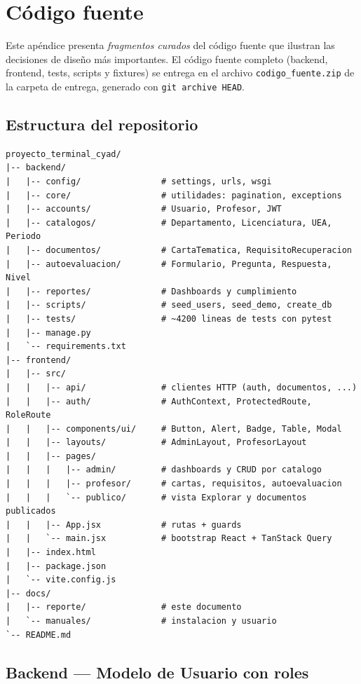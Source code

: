 \section{Código fuente}\label{apx:codigo}
\justifying

Este apéndice presenta \emph{fragmentos curados} del código fuente que ilustran las decisiones de diseño más importantes. El código fuente completo (backend, frontend, tests, scripts y fixtures) se entrega en el archivo \texttt{codigo\_fuente.zip} de la carpeta de entrega, generado con \texttt{git archive HEAD}.

\subsection{Estructura del repositorio}

\begin{Verbatim}[fontsize=\small, frame=single]
proyecto_terminal_cyad/
|-- backend/
|   |-- config/                # settings, urls, wsgi
|   |-- core/                  # utilidades: pagination, exceptions
|   |-- accounts/              # Usuario, Profesor, JWT
|   |-- catalogos/             # Departamento, Licenciatura, UEA, Periodo
|   |-- documentos/            # CartaTematica, RequisitoRecuperacion
|   |-- autoevaluacion/        # Formulario, Pregunta, Respuesta, Nivel
|   |-- reportes/              # Dashboards y cumplimiento
|   |-- scripts/               # seed_users, seed_demo, create_db
|   |-- tests/                 # ~4200 lineas de tests con pytest
|   |-- manage.py
|   `-- requirements.txt
|-- frontend/
|   |-- src/
|   |   |-- api/               # clientes HTTP (auth, documentos, ...)
|   |   |-- auth/              # AuthContext, ProtectedRoute, RoleRoute
|   |   |-- components/ui/     # Button, Alert, Badge, Table, Modal
|   |   |-- layouts/           # AdminLayout, ProfesorLayout
|   |   |-- pages/
|   |   |   |-- admin/         # dashboards y CRUD por catalogo
|   |   |   |-- profesor/      # cartas, requisitos, autoevaluacion
|   |   |   `-- publico/       # vista Explorar y documentos publicados
|   |   |-- App.jsx            # rutas + guards
|   |   `-- main.jsx           # bootstrap React + TanStack Query
|   |-- index.html
|   |-- package.json
|   `-- vite.config.js
|-- docs/
|   |-- reporte/               # este documento
|   `-- manuales/              # instalacion y usuario
`-- README.md
\end{Verbatim}

\subsection{Backend --- Modelo de Usuario con roles}

